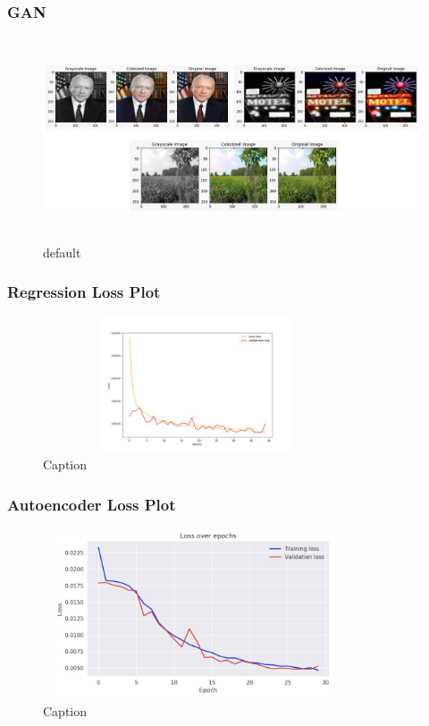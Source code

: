 \documentclass{article}
\begin{document}
\subsubsection{GAN}

\begin{figure}[htp]

    \centering
    \includegraphics[width=15cm, height=6cm]{gan-inference.png}\hfill
    \caption{default}
    
\end{figure}

\subsubsection{Regression Loss Plot}

\begin{figure}[htbp!]
\begin{center}
    \includegraphics[width=9cm, height=4cm]{regression-plot.jpg}
    \caption{Caption}
\end{center}
\end{figure}

\subsubsection{Autoencoder Loss Plot}

\begin{figure}[htbp!]
\begin{center}
    \includegraphics[width=9cm, height=5cm]{encoder-decoder-plot.jpg}
    \caption{Caption}
\end{center}
\end{figure}
\end{document}
